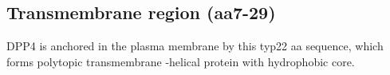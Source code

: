 \subsection{Transmembrane region (aa7-29)}

DPP4 is anchored in the plasma membrane by this typ22 aa sequence, which forms polytopic transmembrane \alpha-helical protein with hydrophobic core.~\cite{Hong_1990}